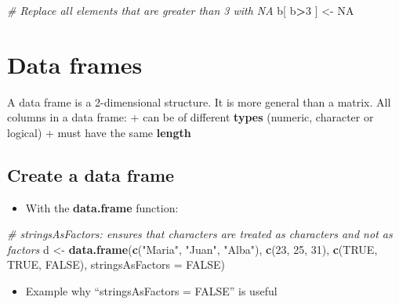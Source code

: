 \documentclass[]{book}
\newenvironment{Shaded}{\begin{snugshade}}{\end{snugshade}}
\newcommand{\CommentTok}[1]{\textcolor[rgb]{0.56,0.35,0.01}{\textit{#1}}}
\newcommand{\DataTypeTok}[1]{\textcolor[rgb]{0.13,0.29,0.53}{#1}}
\newcommand{\DecValTok}[1]{\textcolor[rgb]{0.00,0.00,0.81}{#1}}
\newcommand{\KeywordTok}[1]{\textcolor[rgb]{0.13,0.29,0.53}{\textbf{#1}}}
\newcommand{\NormalTok}[1]{#1}
\newcommand{\OperatorTok}[1]{\textcolor[rgb]{0.81,0.36,0.00}{\textbf{#1}}}
\newcommand{\OtherTok}[1]{\textcolor[rgb]{0.56,0.35,0.01}{#1}}
\newcommand{\StringTok}[1]{\textcolor[rgb]{0.31,0.60,0.02}{#1}}
\providecommand{\tightlist}{%
  \setlength{\itemsep}{0pt}\setlength{\parskip}{0pt}}
\begin{document}
\begin{Shaded}
\begin{Highlighting}[]
\CommentTok{# Replace all elements that are greater than 3 with NA}
\NormalTok{b[ b}\OperatorTok{>}\DecValTok{3}\NormalTok{ ] <-}\StringTok{ }\OtherTok{NA}
\end{Highlighting}
\end{Shaded}

\hypertarget{data-frames}{%
\section{Data frames}\label{data-frames}}

A data frame is a 2-dimensional structure.
 It is more general than a matrix.
All columns in a data frame:
+ can be of different \textbf{types} (numeric, character or logical)
+ must have the same \textbf{length}

\hypertarget{create-a-data-frame}{%
\subsection{Create a data frame}\label{create-a-data-frame}}

\begin{itemize}
\tightlist
\item
  With the \textbf{data.frame} function:
\end{itemize}

\begin{Shaded}
\begin{Highlighting}[]
\CommentTok{# stringsAsFactors: ensures that characters are treated as characters and not as factors}
\NormalTok{d <-}\StringTok{ }\KeywordTok{data.frame}\NormalTok{(}\KeywordTok{c}\NormalTok{(}\StringTok{"Maria"}\NormalTok{, }\StringTok{"Juan"}\NormalTok{, }\StringTok{"Alba"}\NormalTok{), }
    \KeywordTok{c}\NormalTok{(}\DecValTok{23}\NormalTok{, }\DecValTok{25}\NormalTok{, }\DecValTok{31}\NormalTok{),}
    \KeywordTok{c}\NormalTok{(}\OtherTok{TRUE}\NormalTok{, }\OtherTok{TRUE}\NormalTok{, }\OtherTok{FALSE}\NormalTok{),}
    \DataTypeTok{stringsAsFactors =} \OtherTok{FALSE}\NormalTok{)}
\end{Highlighting}
\end{Shaded}

\begin{itemize}
\tightlist
\item
  Example why ``stringsAsFactors = FALSE'' is useful
\end{itemize}
\end{document}
